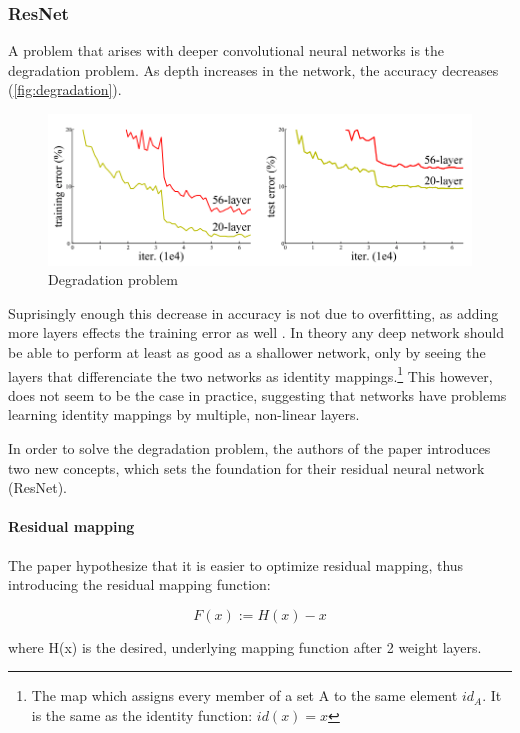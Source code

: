 \subsubsection{ResNet}
A problem that arises with deeper convolutional neural networks is the degradation problem. As depth increases in the network, the accuracy decreases (\autoref{fig:degradation}).

\begin{figure}[!h]
	\centering
	\includegraphics[scale=0.5]{fig/degradation.png}
	\caption{Degradation problem \citep{Wu2017}}
	\label{fig:degradation}
\end{figure}

Suprisingly enough this decrease in accuracy is not due to overfitting, as adding more layers effects the training error as well \citep{Wu2017}. In theory any deep network should be able to perform at least as good as a shallower network, only by seeing the layers that differenciate the two networks as identity mappings.\footnote{The map which assigns every member of a set A to the same element  $id_{A}$. It is the same as the identity function: $id(x)=x$} This however, does not seem to be the case in practice, suggesting that networks have problems learning identity mappings by multiple, non-linear layers.

In order to solve the degradation problem, the authors of the paper introduces two new concepts, which sets the foundation for their residual neural network (ResNet).

\paragraph{Residual mapping}
The paper hypothesize that it is easier to optimize residual mapping, thus introducing the residual mapping function:

\begin{equation}
	F(x) := H(x) - x
\end{equation}

where H(x) is the desired, underlying mapping function after 2 weight layers.


